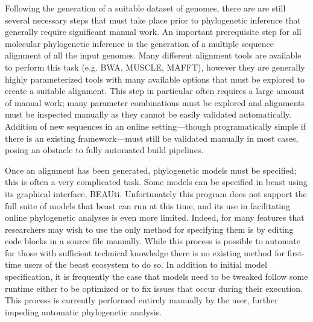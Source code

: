 Following the generation of a suitable dataset of genomes, there are are still several necessary steps that must take place prior to phylogenetic inference that generally require significant manual work.
An important prerequisite step for all molecular phylogenetic inference is the generation of a multiple sequence alignment of all the input genomes.
Many different alignment tools are available to perform this task (e.g. BWA, MUSCLE, MAFFT), however they are generally highly parameterized tools with many available options that must be explored to create a suitable alignment.
This step in particular often requires a large amount of manual work; many parameter combinations must be explored and alignments must be inspected manually as they cannot be easily validated automatically.
Addition of new sequences in an online setting---though programatically simple if there is an existing framework---must still be validated manually in most cases, posing an obstacle to fully automated build pipelines.

Once an alignment has been generated, phylogenetic models must be specified; this is often a very complicated task.
Some models can be specified in \gls{beast} using its graphical interface, BEAUti.
Unfortunately this program does not support the full suite of models that \gls{beast} can run at this time, and its use in facilitating online phylogenetic analyses is even more limited.
Indeed, for many features that researchers may wish to use the only method for specifying them is by editing code blocks in a source file manually.
While this process is possible to automate for those with sufficient technical knowledge there is no existing method for first-time users of the \gls{beast} ecosystem to do so.
In addition to initial model specification, it is frequently the case that models need to be tweaked follow some runtime either to be optimized or to fix issues that occur during their execution.
This process is currently performed entirely manually by the user, further impeding automatic phylogenetic analysis.

